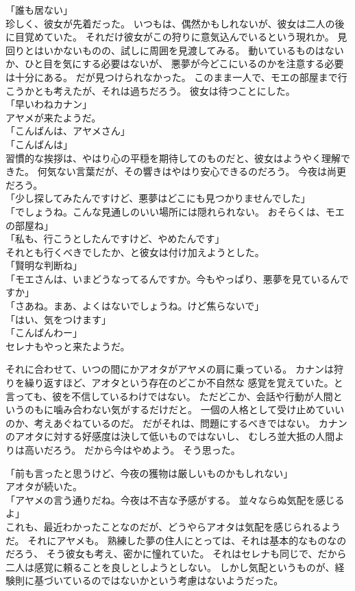 \documentclass[../IHMain]{subfiles}
\begin{document}
「誰も居ない」\\
珍しく、彼女が先着だった。
いつもは、偶然かもしれないが、彼女は二人の後に目覚めていた。
それだけ彼女がこの狩りに意気込んでいるという現れか。
見回りとはいかないものの、試しに周囲を見渡してみる。
動いているものはないか、ひと目を気にする必要はないが、
悪夢が今どこにいるのかを注意する必要は十分にある。
だが見つけられなかった。
このまま一人で、モエの部屋まで行こうかとも考えたが、それは過ちだろう。
彼女は待つことにした。\\

「早いわねカナン」\\
アヤメが来たようだ。\\
「こんばんは、アヤメさん」\\
「こんばんは」\\
習慣的な挨拶は、やはり心の平穏を期待してのものだと、彼女はようやく理解できた。
何気ない言葉だが、その響きはやはり安心できるのだろう。
今夜は尚更だろう。\\
「少し探してみたんですけど、悪夢はどこにも見つかりませんでした」\\
「でしょうね。こんな見通しのいい場所には隠れられない。
おそらくは、モエの部屋ね」\\
「私も、行こうとしたんですけど、やめたんです」\\
それとも行くべきでしたか、と彼女は付け加えようとした。\\
「賢明な判断ね」\\
「モエさんは、いまどうなってるんですか。今もやっぱり、悪夢を見ているんですか」\\
「さあね。まあ、よくはないでしょうね。けど焦らないで」\\
「はい、気をつけます」\\
「こんばんわー」\\
セレナもやっと来たようだ。

それに合わせて、いつの間にかアオタがアヤメの肩に乗っている。
カナンは狩りを繰り返すほど、アオタという存在のどこか不自然な
感覚を覚えていた。と言っても、彼を不信しているわけではない。
ただどこか、会話や行動が人間というのもに噛み合わない気がするだけだと。
一個の人格として受け止めていいのか、考えあぐねているのだ。
だがそれは、問題にするべきではない。
カナンのアオタに対する好感度は決して低いものではないし、
むしろ並大抵の人間よりは高いだろう。
だから今はやめよう。
そう思った。

「前も言ったと思うけど、今夜の獲物は厳しいものかもしれない」\\
アオタが続いた。\\
「アヤメの言う通りだね。今夜は不吉な予感がする。
並々ならぬ気配を感じるよ」\\
これも、最近わかったことなのだが、どうやらアオタは気配を感じられるようだ。
それにアヤメも。
熟練した夢の住人にとっては、それは基本的なものなのだろう、
そう彼女も考え、密かに憧れていた。
それはセレナも同じで、だから二人は感覚に頼ることを良しとしようとしない。
しかし気配というものが、経験則に基づいているのではないかという考慮はないようだった。
\end{document}
